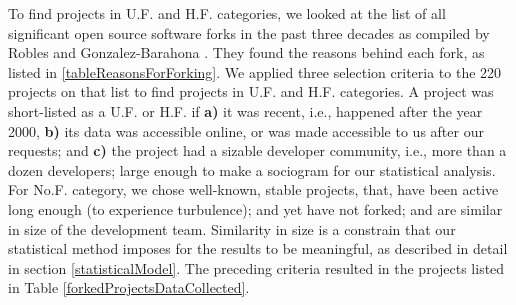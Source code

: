 \documentclass[11pt]{report}
\begin{document}
To find projects in U.F. and H.F. categories, we looked at the list of all significant open source software forks in the past three decades as compiled by Robles and Gonzalez-Barahona \cite{Robles}. They found the reasons behind each fork, as listed in \ref{tableReasonsForForking}. We applied three selection criteria to the 220 projects on that list to find projects in U.F. and H.F. categories. A project was short-listed as a U.F. or H.F. if \textbf{a)} it was recent, i.e., happened after the year 2000, \textbf{b)} its data was accessible online, or was made accessible to us after our requests; and \textbf{c)} the project had a sizable developer community, i.e., more than a dozen developers; large enough to make a sociogram for our statistical analysis. For No.F. category, we chose well-known, stable projects, that,  have been active long enough (to experience turbulence); and yet have not forked; and are similar in size of the development team. Similarity in size is a constrain that our statistical method imposes for the results to be meaningful, as described in detail in section \ref{statisticalModel}.  The preceding criteria resulted in the projects listed in Table \ref{forkedProjectsDataCollected}. 
\end{document}
